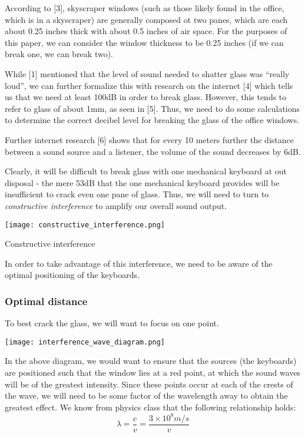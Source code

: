 \documentclass{article}
\begin{document}
\begin{multicols}{2}
According to [3], skyscraper windows (such as those likely found in the office, which is in a skyscraper) are generally composed ot two panes, which are each about 0.25 inches thick with about 0.5 inches of air space. For the purposes of this paper, we can consider the window thickness to be 0.25 inches (if we can break one, we can break two).

While [1] mentioned that the level of sound needed to shatter glass was ``really loud'', we can further formalize this with research on the internet [4] which tells us that we need at least 100dB in order to break glass. However, this tends to refer to glass of about 1mm, as seen in [5]. Thus, we need to do some calculations to determine the correct decibel level for breaking the glass of the office windows.

Further internet research [6] shows that for every 10 meters further the distance between a sound source and a listener, the volume of the sound decreases by 6dB. 


Clearly, it will be difficult to break glass with one mechanical keyboard at out disposal - the mere 53dB that the one mechanical keyboard provides will be insufficient to crack even one pane of glass. Thus, we will need to turn to \emph{constructive interference} to amplify our overall sound output. 

\begin{center}
    \texttt{[image: constructive\_interference.png]} \end{center}
\begin{center}\small Constructive interference \end{center}

In order to take advantage of this interference, we need to be aware of the optimal positioning of the keyboards.

\subsubsection{Optimal distance}

To best crack the glass, we will want to focus on one point. 

\begin{center}
\texttt{[image: interference\_wave\_diagram.png]} \end{center}

In the above diagram, we would want to ensure that the sources (the keyboards) are positioned such that the window lies at a red point, at which the sound waves will be of the greatest intensity. Since these points occur at each of the crests of the wave, we will need to be some factor of the wavelength away to obtain the greatest effect. We know from physics class that the following relationship holds: 
$$\lambda = \frac{c}{v} = \frac{3\times 10^{8} m/s}{v}$$


\end{multicols}
\end{document}
